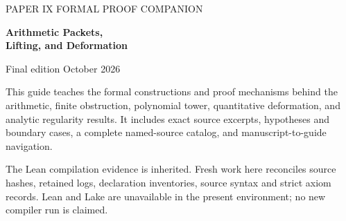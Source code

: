 

\begin{titlepage}
\vspace*{2cm}
{\large\sffamily\color{muted}PAPER IX \quad FORMAL PROOF COMPANION}\par
\vspace{1cm}
{\Huge\sffamily\bfseries\color{teal}Arithmetic Packets,\\ Lifting, and Deformation}\par
\vspace{.7cm}{\LARGE\sffamily Lean Guide}\par
\vspace{1.5cm}{\Large Komorebi P.}\par
\vspace{.5cm}Final edition  October 2026\par
\vfill
This guide teaches the formal constructions and proof mechanisms behind the arithmetic, finite obstruction, polynomial tower, quantitative deformation, and analytic regularity results. It includes exact source excerpts, hypotheses and boundary cases, a complete named-source catalog, and manuscript-to-guide navigation.

The Lean compilation evidence is inherited. Fresh work here reconciles source hashes, retained logs, declaration inventories, source syntax and strict axiom records. Lean and Lake are unavailable in the present environment; no new compiler run is claimed.
\end{titlepage}
\tableofcontents
\clearpage

\clearpage
\clearpage
\clearpage
\clearpage
\clearpage
\clearpage
\clearpage
\clearpage
\clearpage
\clearpage
\clearpage
\clearpage
\clearpage
\clearpage

